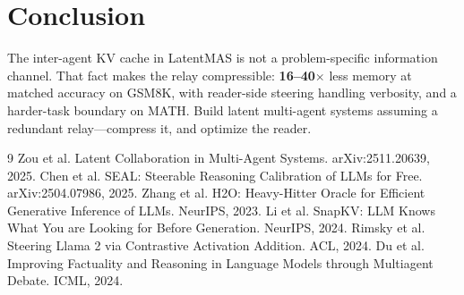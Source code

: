 \documentclass[11pt]{article}
\begin{document}
\section{Conclusion}
The inter-agent KV cache in LatentMAS is not a problem-specific information
channel. That fact makes the relay compressible: \textbf{16--40$\times$} less
memory at matched accuracy on GSM8K, with reader-side steering handling
verbosity, and a harder-task boundary on MATH. Build latent multi-agent systems
assuming a redundant relay---compress it, and optimize the reader.

\begin{thebibliography}{9}
\small
{} Zou et al. Latent Collaboration in Multi-Agent Systems.
arXiv:2511.20639, 2025.
 Chen et al. SEAL: Steerable Reasoning Calibration of LLMs for Free.
arXiv:2504.07986, 2025.
 Zhang et al. H2O: Heavy-Hitter Oracle for Efficient Generative
Inference of LLMs. NeurIPS, 2023.
 Li et al. SnapKV: LLM Knows What You are Looking for Before
Generation. NeurIPS, 2024.
 Rimsky et al. Steering Llama 2 via Contrastive Activation Addition.
ACL, 2024.
 Du et al. Improving Factuality and Reasoning in Language
Models through Multiagent Debate. ICML, 2024.
\end{thebibliography}
\end{document}
